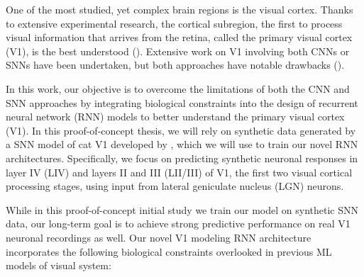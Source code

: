 One of the most studied, yet complex brain regions is the visual cortex.
Thanks to extensive experimental research, the cortical subregion, the first to process visual information that arrives from the retina, called the primary visual
cortex (V1), is the best understood (\citet{miikkulainen2006computational}). 
Extensive work on V1 involving both CNNs or SNNs have been undertaken, but both approaches have notable drawbacks (\citet{niell2021cortical}).

In this work, our objective is to overcome the limitations of both the CNN and SNN
approaches by integrating biological constraints into the design of recurrent neural network (RNN) models to better understand the primary visual cortex (V1). In this proof-of-concept thesis, we will rely on synthetic data generated by a SNN model of cat V1 developed by \citet{antolik2024comprehensive}, which we will use to train our novel RNN architectures. Specifically, we focus on predicting synthetic neuronal responses in layer IV (LIV) and layers II and III (LII/III) of V1, the first two visual cortical processing stages, using input from lateral geniculate nucleus (LGN) neurons. 

While in this proof-of-concept initial study we train our model on synthetic SNN data, our long-term goal is to achieve strong predictive performance on real V1
neuronal recordings as well. Our novel V1 modeling RNN architecture incorporates the following biological constraints overlooked in previous ML models of visual system:


